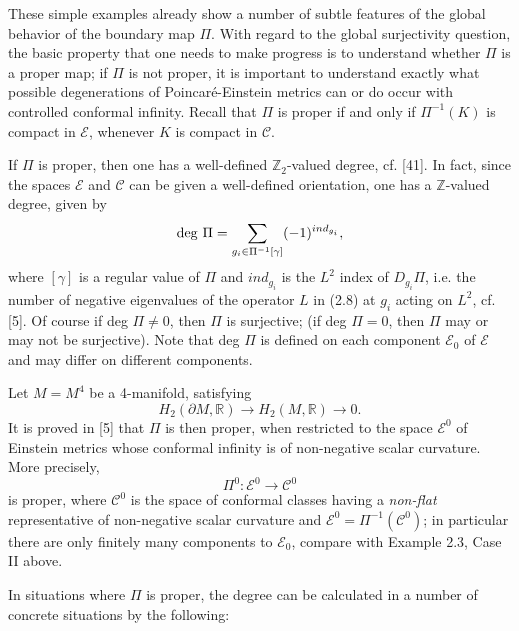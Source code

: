 \documentclass[11pt,amsfonts]{amsart}
\begin{document}
 These simple examples already show a number of subtle features of the 
global behavior of the boundary map $\Pi$. With regard to the global 
surjectivity question, the basic property that one needs to make 
progress is to understand whether $\Pi$ is a proper map; if $\Pi$ is 
not proper, it is important to understand exactly what possible 
degenerations of Poincar\'e-Einstein metrics can or do  occur with 
controlled conformal infinity. Recall that $\Pi$ is proper if and only 
if $\Pi^{-1}(K)$ is compact in ${\mathcal E}$, whenever $K$ is compact in 
${\mathcal C}$. 

 If $\Pi$ is proper, then one has a well-defined ${\mathbb Z}_{2}$-valued 
degree, cf. [41]. In fact, since the spaces ${\mathcal E}$ and ${\mathcal C}$ 
can be given a well-defined orientation, one has a ${\mathbb Z}$-valued degree, 
given by
\begin{equation} \label{e2.14}
{\rm deg} \ \Pi = \sum_{g_{i}\in\Pi^{-1}[\gamma ]}(-1)^{ind_{g_{i}}}, 
\end{equation}
where $[\gamma]$ is a regular value of $\Pi$ and $ind_{g_{i}}$ is the 
$L^{2}$ index of $D_{g_{i}}\Pi$, i.e. the number of negative 
eigenvalues of the operator $L$ in (2.8) at $g_{i}$ acting on $L^{2}$, 
cf. [5]. Of course if deg $\Pi \neq 0$, then $\Pi$ is surjective; (if 
deg $\Pi = 0$, then $\Pi$ may or may not be surjective). Note that deg $\Pi$ is 
defined on each component ${\mathcal E}_{0}$ of ${\mathcal E} $ and may differ 
on different components. 

 Let $M = M^{4}$ be a 4-manifold, satisfying 
\begin{equation} \label{e2.15}
H_{2}(\partial M, {\mathbb R}) \rightarrow H_{2}(M, {\mathbb R}) \rightarrow 0.
\end{equation}
It is proved in [5] that $\Pi$ is then proper, when restricted to the space 
${\mathcal E}^{0}$ of Einstein metrics whose conformal infinity is of non-negative 
scalar curvature. More precisely, 
\begin{equation} \label{e2.16}
\Pi^{0}: {\mathcal E}^{0} \rightarrow  {\mathcal C}^{0} 
\end{equation}
is proper, where ${\mathcal C}^{0}$ is the space of conformal classes 
having a {\it non-flat} representative of non-negative scalar curvature and 
${\mathcal E}^{0} = \Pi^{-1}({\mathcal C}^{0})$; in particular there are only 
finitely many components to ${\mathcal E}_{0}$, compare with Example 2.3, 
Case II above. 

 In situations where $\Pi$ is proper, the degree can be calculated in 
a number of concrete situations by the following:
\end{document}
